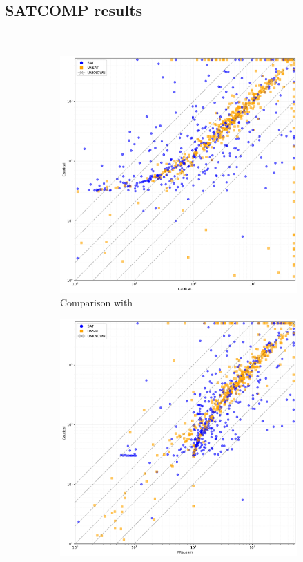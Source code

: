 \subsection{SATCOMP results}~\label{subsec:eval-satcomp}

\begin{figure}[!t]
    \centering
    \begin{subfigure}[t]{0.4\textwidth}
        \centering
        \includegraphics[width=\textwidth]{figs/cautical_vs_cadical_log.png}
        \caption{Comparison with \cadical}
        \label{fig:cautical-vs-cadical}
    \end{subfigure}
    \hspace{0.06\textwidth}
    \begin{subfigure}[t]{0.4\textwidth}
        \centering
        \includegraphics[width=\textwidth]{figs/cautical_vs_prelearn_log.png}

\end{subfigure}
\end{figure}
